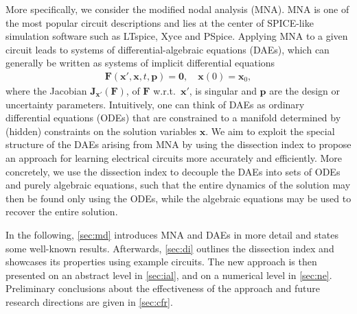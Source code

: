\documentclass[AMA,STIX1COL]{WileyNJD-v2}
\newcommand{\mb}[1]{\mathbf{#1}}
\begin{document}
More specifically, we consider the modified nodal analysis\cite{ho1975} (MNA). MNA is one of the most popular circuit descriptions and lies at the center of SPICE-like simulation software such as LTspice\cite{ltspice}, Xyce\cite{xyce} and PSpice\cite{pspice}. Applying MNA to a given circuit leads to systems of differential-algebraic equations (DAEs), which can generally be written as systems of implicit differential equations \cite{denk1991}
\begin{align}
    \mb{F}(\mb{x}', \mb{x}, t, \mb{p}) = \mb{0}, \quad \mb{x}(0) = \mb{x}_0, \label{eq:int_dae}
\end{align}
where the Jacobian $\mb{J}_{\mb{x}'}(\mb{F})$, of $\mb{F}$ w.r.t.~$\mb{x}'$, is singular and $\mb{p}$ are the design or uncertainty parameters. Intuitively, one can think of DAEs as ordinary differential equations (ODEs) that are constrained to a manifold determined by (hidden) constraints on the solution variables $\mb{x}$. We aim to exploit the special structure of the DAEs arising from MNA by using the dissection index\cite{jansen2014} to propose an approach for learning electrical circuits more accurately and efficiently. More concretely, we use the dissection index to decouple the DAEs into sets of ODEs and purely algebraic equations, such that the entire dynamics of the solution may then be found only using the ODEs, while the algebraic equations may be used to recover the entire solution.

In the following, \autoref{sec:md} introduces MNA and DAEs in more detail and states some well-known results. Afterwards, \autoref{sec:di} outlines the dissection index and showcases its properties using example circuits. The new approach is then presented on an abstract level in \autoref{sec:ial}, and on a numerical level in \autoref{sec:ne}. Preliminary conclusions about the effectiveness of the approach and future research directions are given in \autoref{sec:cfr}.
\end{document}
